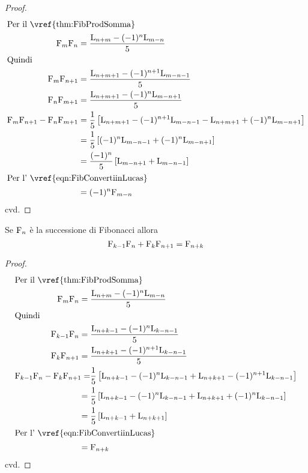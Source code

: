 \begin{proof}
	\begin{align*}
		\intertext{Per il~\vref{thm:FibProdSomma}}
		\Fib{m}\Fib{n}={}   & \dfrac{\Luc{n+m}-(-1)^n\Luc{m-n}}{5}                                                       \\
		\intertext{Quindi}
		\Fib{m}\Fib{n+1}={} & \dfrac{\Luc{n+m+1}-(-1)^{n+1}\Luc{m-n-1}}{5}                                               \\
		\Fib{n}\Fib{m+1}={} & \dfrac{\Luc{n+m+1}-(-1)^{n}\Luc{m-n+1}}{5}                                                 \\
		\Fib{m}\Fib{n+1}-\Fib{n}\Fib{m+1}
		={}                 & \dfrac{1}{5}\left[\Luc{n+m+1}-(-1)^{n+1}\Luc{m-n-1}-\Luc{n+m+1}+(-1)^{n}\Luc{m-n+1}\right] \\
		={}                 & \dfrac{1}{5}\left[(-1)^{n}\Luc{m-n-1}+(-1)^{n}\Luc{m-n+1}\right]                           \\
		={}                 & \dfrac{(-1)^{n}}{5}\left[\Luc{m-n+1}+\Luc{m-n-1}\right]                                    \\
		\intertext{Per l'~\vref{eqn:FibConvertiinLucas}}
		={}                 & (-1)^{n}\Fib{m-n}                                                                          \\
	\end{align*}
	cvd.
\end{proof}
\begin{thm}\label{thm:FibHonsberger}
	Se $\mathrm{F}_{n}$ è la successione di Fibonacci allora
	\begin{equation}
		\mathrm{F}_{k-1}\mathrm{F}_{n}+\mathrm{F}_{k}\mathrm{F}_{n+1}=\mathrm{F}_{n+k}
	\end{equation}\label{eqn:FibHonsberger}
\end{thm}
\begin{proof}
	\begin{align*}
		\intertext{Per il~\vref{thm:FibProdSomma}}
		\Fib{m}\Fib{n}={}   & \dfrac{\Luc{n+m}-(-1)^n\Luc{m-n}}{5}                                                     \\
		\intertext{Quindi}
		\Fib{k-1}\Fib{n}={} & \dfrac{\Luc{n+k-1}-(-1)^n\Luc{k-n-1}}{5}                                                 \\
		\Fib{k}\Fib{n+1}={} & \dfrac{\Luc{n+k+1}-(-1)^{n+1}\Luc{k-n-1}}{5}                                             \\
		\Fib{k-1}\Fib{n}-\Fib{k}\Fib{n+1}=
		                    & \dfrac{1}{5}\left[\Luc{n+k-1}-(-1)^n\Luc{k-n-1}+\Luc{n+k+1}-(-1)^{n+1}\Luc{k-n-1}\right] \\
		={}                 & \dfrac{1}{5}\left[\Luc{n+k-1}-(-1)^n\Luc{k-n-1}+\Luc{n+k+1}+(-1)^{n}\Luc{k-n-1}\right]   \\
		={}                 & \dfrac{1}{5}\left[\Luc{n+k-1}+\Luc{n+k+1}\right]                                         \\
		\intertext{Per l'~\vref{eqn:FibConvertiinLucas}}
		={}                 & \Fib{n+k}
	\end{align*}
	cvd.
\end{proof}
